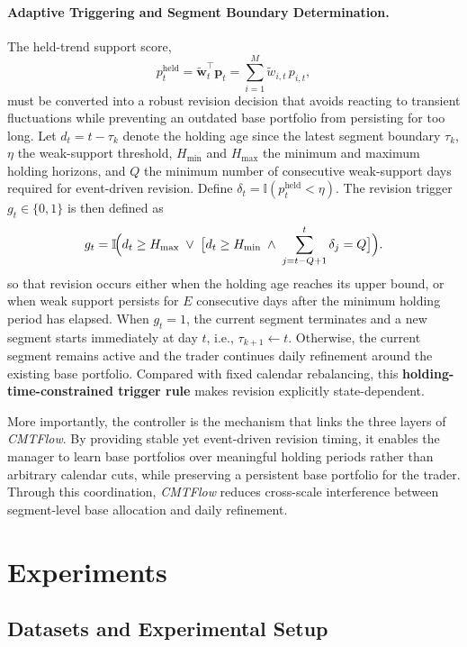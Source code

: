 \documentclass[letterpaper]{article} %
\begin{document}
\paragraph{Adaptive Triggering and Segment Boundary Determination.}
The held-trend support score,
\[
p_t^{\mathrm{held}}
=
\tilde{\mathbf{w}}_t^\top \mathbf{p}_t
=
\sum_{i=1}^{M} \tilde{w}_{i,t}\,p_{i,t},
\]
must be converted into a robust revision decision that avoids reacting to transient fluctuations while preventing an outdated base portfolio from persisting for too long. Let \(d_t=t-\tau_k\) denote the holding age since the latest segment boundary \(\tau_k\), \(\eta\) the weak-support threshold, \(H_{\min}\) and \(H_{\max}\) the minimum and maximum holding horizons, and \(Q\) the minimum number of consecutive weak-support days required for event-driven revision. Define \(\delta_t=\mathbb{I}(p_t^{\mathrm{held}}<\eta)\). The revision trigger \(g_t\in\{0,1\}\) is then defined as
\[
g_t
=
\mathbb{I}\!\Bigl(
d_t \ge H_{\max}
\;\lor\;
\bigl[
d_t \ge H_{\min}
\;\land\;
\sum_{j=t-Q+1}^{t}\delta_j = Q
\bigr]
\Bigr).
\]
so that revision occurs either when the holding age reaches its upper bound, or when weak support persists for \(E\) consecutive days after the minimum holding period has elapsed. When \(g_t=1\), the current segment terminates and a new segment starts immediately at day \(t\), i.e., \(\tau_{k+1}\leftarrow t\). Otherwise, the current segment remains active and the trader continues daily refinement around the existing base portfolio. Compared with fixed calendar rebalancing, this \textbf{holding-time-constrained trigger rule} makes revision explicitly state-dependent.

More importantly, the controller is the mechanism that links the three layers of \textit{CMTFlow}. By providing stable yet event-driven revision timing, it enables the manager to learn base portfolios over meaningful holding periods rather than arbitrary calendar cuts, while preserving a persistent base portfolio for the trader. Through this coordination, \textit{CMTFlow} reduces cross-scale interference between segment-level base allocation and daily refinement.

\section{Experiments}
\subsection{Datasets and Experimental Setup}
\end{document}
